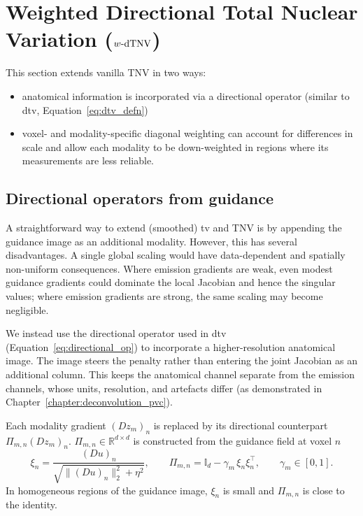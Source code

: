 \section{Weighted Directional Total Nuclear Variation (\texorpdfstring{$w\text{-}\mathrm{dTNV}$}{w-dTNV})}
\label{sec:wdtnv}

This section extends vanilla TNV \cite{rigieJointReconstructionMultichannel2015, holtTotalNuclearVariation2014} in two ways:
\begin{itemize}
    \item anatomical information is incorporated via a directional operator (similar to \gls{dtv}, Equation~\eqref{eq:dtv_defn})
    \item  voxel- and modality-specific diagonal weighting can account for differences in scale and allow each modality to be down-weighted in regions where its measurements are less reliable.

\end{itemize}

\subsection{Directional operators from guidance}
\label{subsec:directional_from_guidance}

A straightforward way to extend (smoothed) \gls{tv} and TNV is by appending the guidance image as an additional modality. However, this has several disadvantages. A single global scaling would have data-dependent and spatially non-uniform consequences. Where emission gradients are weak, even modest guidance gradients could dominate the local Jacobian and hence the singular values; where emission gradients are strong, the same scaling may become negligible.

We instead use the directional operator used in \gls{dtv} (Equation~\ref{eq:directional_op}) to incorporate a higher-resolution anatomical image. The image steers the penalty rather than entering the joint Jacobian as an additional column. This keeps the anatomical channel separate from the emission channels, whose units, resolution, and artefacts differ (as demonstrated in Chapter~\ref{chapter:deconvolution_pvc}).

Each modality gradient $(D z_m)_n$ is replaced by its directional counterpart $\Pi_{m,n}(D z_m)_n$.  $\Pi_{m,n}\in\mathbb{R}^{d\times d}$ is constructed from the guidance field at voxel $n$
\begin{equation}
\xi_n
=
\frac{(D u)_n}{\sqrt{\|(D u)_n\|_2^2+\eta^2}},
\qquad
\Pi_{m,n}=\mathbb{I}_d-\gamma_m\,\xi_n\xi_n^\top,
\qquad \gamma_m\in[0,1].
\label{eq:wdtnv_directional_operator}
\end{equation}
In homogeneous regions of the guidance image, $\xi_n$ is small and $\Pi_{m,n}$ is close to the identity. 

